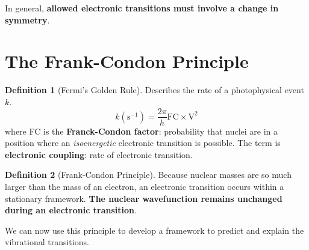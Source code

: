 \documentclass[a4paper]{tufte-handout}
\theoremstyle{definition}
\newtheorem{definition}{Definition}
\begin{document}
In general, \textbf{allowed electronic transitions must involve a change in symmetry}. \cite{atkins2014atkins}

\section{The Frank-Condon Principle}

\begin{definition}[Fermi's Golden Rule] Describes the rate of a photophysical event $k$.
  \begin{equation}
    k(\mathrm{s}^{-1}) = \frac{2\pi}{h} \mathrm{FC} \times \mathrm{V}^2
  \end{equation}
  where FC is the \textbf{Franck-Condon factor}: probability that nuclei are in a position where an \textit{isoenergetic} electronic transition is possible.
  The  term is \textbf{electronic coupling}: rate of electronic transition.


\end{definition}

\begin{definition}[Frank-Condon Principle]
  Because nuclear masses are so much larger than the mass of an electron, an electronic transition occurs
  within a stationary framework. \textbf{The nuclear wavefunction remains unchanged during an electronic transition}.
\end{definition}

We can now use this principle to develop a framework to predict and explain the vibrational transitions.
\end{document}
